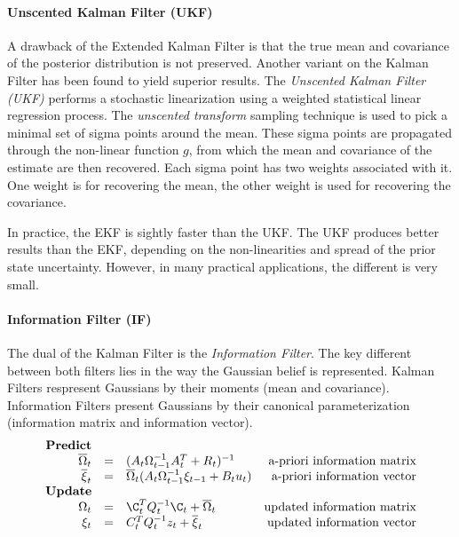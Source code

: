 {\paragraph{Unscented Kalman Filter (UKF)}
A drawback of the Extended Kalman Filter is that the true mean and covariance of the posterior distribution is not preserved.
Another variant on the Kalman Filter has been found to yield superior results.
The \textit{Unscented Kalman Filter (UKF)} performs a stochastic linearization using a weighted statistical linear regression process.
The \textit{unscented transform} sampling technique is used to pick a minimal set of sigma points around the mean.
These sigma points are propagated through the non-linear function $g$, from which the mean and covariance of the estimate are then recovered.
Each sigma point has two weights associated with it. One weight is for recovering the mean, the other weight is used for recovering the covariance.

In practice, the EKF is sightly faster than the UKF.
The UKF produces better results than the EKF, depending on the non-linearities and spread of the prior state uncertainty.
However, in many practical applications, the different is very small.


\paragraph{Information Filter (IF)}
The dual of the Kalman Filter is the \textit{Information Filter}.
The key different between both filters lies in the way the Gaussian belief is represented.
Kalman Filters respresent Gaussians by their moments (mean and covariance).
Information Filters present Gaussians by their canonical parameterization (information matrix and information vector).
\begin{equation}
\label{eq:KF}
\begin{array}{rclr}
\text{\textbf{Predict}} \\
\overline{\Omega}_t & = & (A_t \Omega_{t-1}^{-1} A_t^T + R_t)^{-1}  & \text{a-priori information matrix} \\
\overline{\xi}_t & = & \overline{\Omega}_t ( A_t \Omega_{t-1}^{-1} \xi_{t-1} + B_t u_t )  & \text{a-priori information vector} \\
\text{\textbf{Update}} \\
\Omega_t & = & \C_t^T Q_t^{-1} \C_t + \overline{\Omega}_t & \text{updated information matrix} \\
\xi_t & = & C_t^T Q_t^{-1} z_t + \overline{\xi}_t & \text{updated information vector}
\end{array}
\end{equation}

}
